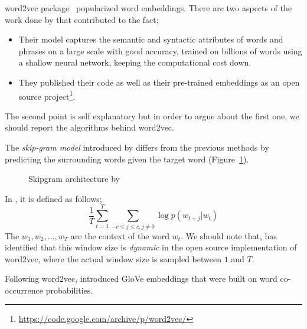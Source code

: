 word2vec package~\cite{mikolov_efficient_2013,mikolov_distributed_2013,mikolov_linguistic_2013} popularized word embeddings.
There are two aspects of the work done by \citeauthor{mikolov_distributed_2013}  that contributed to the fact;
\begin{itemize}
    \item Their model captures the semantic and syntactic attributes of words and phrases on a large scale with good accuracy, trained on billions of words using a shallow neural network, keeping the computational cost down.
    \item They published their code as well as their pre-trained embeddings as an open source project\footnote{\url{https://code.google.com/archive/p/word2vec/}}.
\end{itemize}
The second point is self explanatory but in order to argue about the first one, we should report the algorithms behind word2vec.

The \emph{skip-gram model} introduced by \textcite{mikolov_efficient_2013} differs from the previous methods by predicting the surrounding words given the target word (Figure~\ref{fig:skipgram}).

\begin{figure}[htbp]
    \centering
    \caption{Skipgram architecture by \textcite{mikolov_distributed_2013}}%
    \label{fig:skipgram}
\end{figure}

In , it is defined as follows;
\begin{equation}
    \frac{1}{T}\sum_{t=1}^{T}\sum_{-c \leq j \leq c, j \neq 0} \log p(w_{t+j}|w_t)
\end{equation}
The $w_{1}, w_{2}, \dots, w_{T}$ are the context of the word $w_t$.
We should note that, \textcite{levy_improving_2015} has identified that this window size is \emph{dynamic} in the open source implementation of word2vec, where the actual window size is sampled between $1$ and $T$.

Following word2vec, \textcite{pennington_glove_2014} introduced GloVe embeddings that were built on word co-occurrence probabilities.


